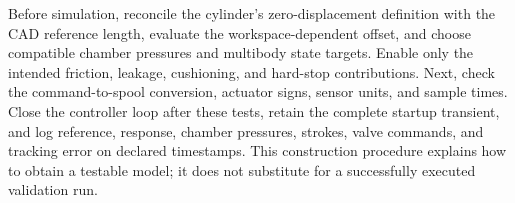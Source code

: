 Before simulation, reconcile the cylinder's zero-displacement definition with the CAD reference length, evaluate the workspace-dependent offset, and choose compatible chamber pressures and multibody state targets. Enable only the intended friction, leakage, cushioning, and hard-stop contributions. Next, check the command-to-spool conversion, actuator signs, sensor units, and sample times. Close the controller loop after these tests, retain the complete startup transient, and log reference, response, chamber pressures, strokes, valve commands, and tracking error on declared timestamps. This construction procedure explains how to obtain a testable model; it does not substitute for a successfully executed validation run.
